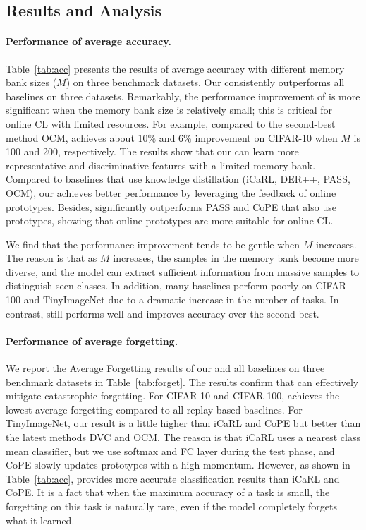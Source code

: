 \subsection{Results and Analysis}
\label{result}
\paragraph{Performance of average accuracy.}
Table~\ref{tab:acc} presents the results of average accuracy with different memory bank sizes ($M$) on three benchmark datasets. Our \frameworkName consistently outperforms all baselines on three datasets.
Remarkably, the performance improvement of \frameworkName is more significant when the memory bank size is relatively small; this is critical for online CL with limited resources. For example, compared to the second-best method OCM, \frameworkName achieves about 10$\%$ and 6$\%$ improvement on CIFAR-10 when $M$ is 100 and 200, respectively. 
The results show that our \frameworkName can learn more representative and discriminative features with a limited memory bank.
Compared to baselines that use knowledge distillation (iCaRL, DER++, PASS, OCM), our \frameworkName achieves better performance by leveraging the feedback of online prototypes.  
Besides, \frameworkName significantly outperforms PASS and CoPE that also use prototypes, showing that online prototypes are more suitable for online CL. 


We find that the performance improvement tends to be gentle when $M$ increases.
The reason is that as $M$ increases, the samples in the memory bank become more diverse, and the model can extract sufficient information from massive samples to distinguish seen classes. 
In addition, many baselines perform poorly on CIFAR-100 and TinyImageNet due to a dramatic increase in the number of tasks. In contrast, \frameworkName still performs well and improves accuracy over the second best.



\paragraph{Performance of average forgetting.}
We report the Average Forgetting results of our \frameworkName and all baselines on three benchmark datasets in Table~\ref{tab:forget}. The results confirm that \frameworkName can effectively mitigate catastrophic forgetting. 
For CIFAR-10 and CIFAR-100, \frameworkName achieves the lowest average forgetting compared to all replay-based baselines. 
For TinyImageNet, our result is a little higher than iCaRL and CoPE but better than the latest methods DVC and OCM. 
The reason is that iCaRL uses a nearest class mean classifier, but we use softmax and FC layer during the test phase, and CoPE slowly updates prototypes with a high momentum.
However, as shown in Table~\ref{tab:acc}, \frameworkName provides more accurate classification results than iCaRL and CoPE. 
It is a fact that when the maximum accuracy of a task is small, the forgetting on this task is naturally rare, even if the model completely forgets what it learned.






